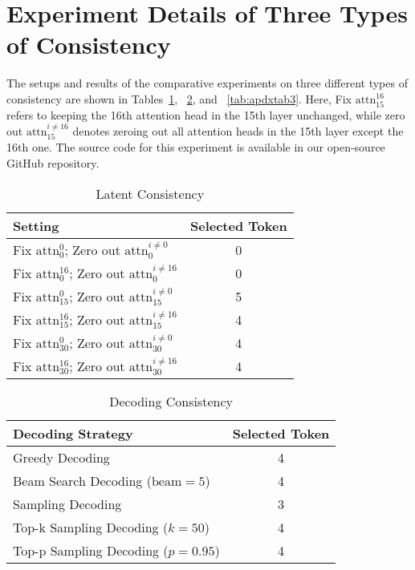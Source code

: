 \section{Experiment Details of Three Types of Consistency} \label{apdx:experiment}


\noindent The setups and results of the comparative experiments on three different types of consistency are shown in Tables~\ref{tab:apdxtab1}, ~\ref{tab:apdxtab2}, and ~\ref{tab:apdxtab3}. Here, Fix $\text{attn}^{16}_{15}$ refers to keeping the 16th attention head in the 15th layer unchanged, while zero out $\text{attn}^{i \neq 16}_{15}$ denotes zeroing out all attention heads in the 15th layer except the 16th one. The source code for this experiment is available in our open-source GitHub repository.


\begin{table}[h!]
\centering
\caption{Latent Consistency}\label{tab:apdxtab1}
\begin{tabular}{lc}
\toprule
Setting                                                                 & Selected Token \\
\midrule
Fix $\text{attn}^0_0$; Zero out $\text{attn}^{i \neq 0}_0$              & 0              \\
Fix $\text{attn}^{16}_0$; Zero out $\text{attn}^{i \neq 16}_0$          & 0              \\
Fix $\text{attn}^0_{15}$; Zero out $\text{attn}^{i \neq 0}_{15}$        & 5              \\
Fix $\text{attn}^{16}_{15}$; Zero out $\text{attn}^{i \neq 16}_{15}$    & 4              \\
Fix $\text{attn}^0_{30}$; Zero out $\text{attn}^{i \neq 0}_{30}$        & 4              \\
Fix $\text{attn}^{16}_{30}$; Zero out $\text{attn}^{i \neq 16}_{30}$    & 4              \\
\bottomrule
\end{tabular}
\end{table}

\begin{table}[h!]
\centering
\caption{Decoding Consistency}\label{tab:apdxtab2}
\begin{tabular}{lc}
\toprule
Decoding Strategy                      & Selected Token \\
\midrule
Greedy Decoding                        & 4              \\
Beam Search Decoding ($\text{beam}=5$) & 4              \\
Sampling Decoding                      & 3              \\
Top-k Sampling Decoding ($k=50$)       & 4              \\
Top-p Sampling Decoding ($p=0.95$)     & 4              \\
\bottomrule
\end{tabular}
\end{table}


